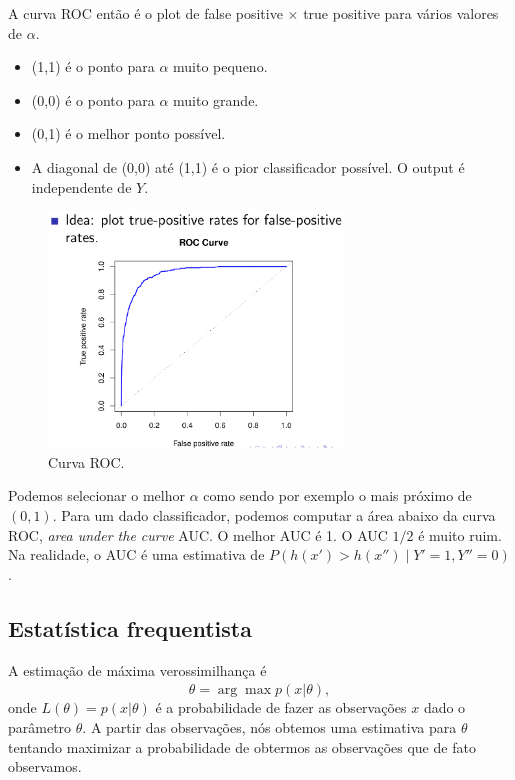 \documentclass[a4paper,fleqn,12pt]{article}
\begin{document}
A curva ROC então é o plot de false positive $\times$ true positive para vários valores de $\alpha$.
\begin{itemize}
\item (1,1) é o ponto para $\alpha$ muito pequeno.
\item (0,0) é o ponto para $\alpha$ muito grande.
\item (0,1) é o melhor ponto possível.
\item A diagonal de (0,0) até (1,1) é o pior classificador possível. O output é independente de $Y$.
\end{itemize}

\begin{figure}[H]
\centering
\includegraphics[width=0.7\textwidth]{fig/roc.png}
\caption{Curva ROC.}
\label{fig:roc}
\end{figure}

Podemos selecionar o melhor $\alpha$ como sendo por exemplo o mais próximo de $(0,1)$. Para um dado classificador, podemos computar a área abaixo da curva ROC, \textit{area under the curve} AUC. O melhor AUC é 1. O AUC $1/2$ é muito ruim. Na realidade, o AUC é uma estimativa de $P(h(x') > h(x'') \mid Y' = 1, Y'' = 0)$.

\subsection{Estatística frequentista}

A estimação de máxima verossimilhança é
$$
\hat{\theta} = \arg \max p(x | \theta),
$$
onde $L(\theta) = p(x | \theta)$ é a probabilidade de fazer as observações $x$ dado o parâmetro $\theta$. A partir das observações, nós obtemos uma estimativa para $\theta$ tentando maximizar a probabilidade de obtermos as observações que de fato observamos.
\end{document}
